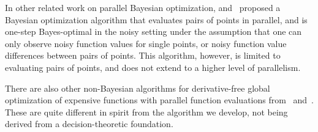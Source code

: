 \documentclass[paper=letter]{scrartcl}
\newcommand{\qEI}{\text{\textit q-EI}}
\begin{document}


In other related work on parallel Bayesian optimization,
\cite{frazier2011value} and~\cite{xie2013bayesian} proposed a Bayesian optimization algorithm that 
evaluates pairs of points in parallel, and is one-step Bayes-optimal in the noisy setting under the assumption that one can only observe noisy function values for single points, or noisy function value differences between pairs of points.  This algorithm, however, is limited to evaluating  pairs of points, and does not extend to a higher level of parallelism. 

There are also other non-Bayesian algorithms for derivative-free global optimization of expensive functions with parallel function evaluations 
from~\cite{dennis1991direct, kennedy2010particle} and~\cite{john1992adaptation}.
These are quite different in spirit from the algorithm we develop, not being derived from a decision-theoretic foundation.
\end{document}
